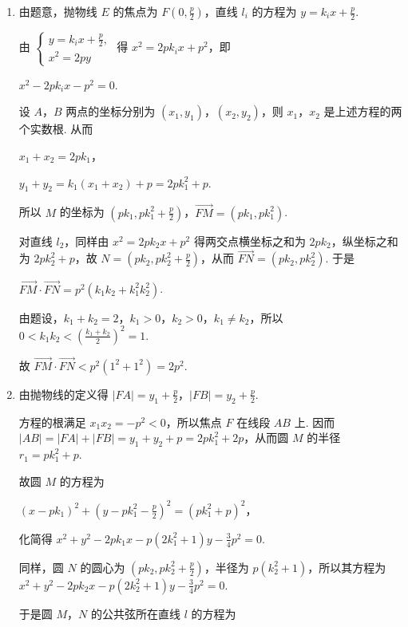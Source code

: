 \begin{solution}
\begin{enumerate}
\item 由题意，抛物线 \(E\) 的焦点为 \(F\left(0,\frac{p}{2}\right)\)，直线 \(l_i\) 的方程为 \(y=k_i x+\frac{p}{2}\).

由 \(\begin{cases}
y=k_i x+\frac{p}{2},\\
x^2=2py
\end{cases}\) 得 \(x^2=2pk_i x+p^2\)，即

\(x^2-2pk_i x-p^2=0\).

设 \(A\)，\(B\) 两点的坐标分别为 \((x_1,y_1)\)，\((x_2,y_2)\)，则 \(x_1\)，\(x_2\) 是上述方程的两个实数根. 从而

\(x_1+x_2=2pk_1\)，

\(y_1+y_2=k_1(x_1+x_2)+p=2pk_1^2+p\).

所以 \(M\) 的坐标为 \(\left(pk_1,pk_1^2+\frac{p}{2}\right)\)，\(\overrightarrow{FM}=(pk_1,pk_1^2)\).

对直线 \(l_2\)，同样由 \(x^2=2pk_2x+p^2\) 得两交点横坐标之和为 \(2pk_2\)，纵坐标之和为 \(2pk_2^2+p\)，故
\(N=\left(pk_2,pk_2^2+\frac{p}{2}\right)\)，从而 \(\overrightarrow{FN}=(pk_2,pk_2^2)\). 于是

\(\overrightarrow{FM}\cdot\overrightarrow{FN}=p^2(k_1k_2+k_1^2k_2^2)\).

由题设，\(k_1+k_2=2\)，\(k_1>0\)，\(k_2>0\)，\(k_1\ne k_2\)，所以 \(0<k_1k_2<\left(\frac{k_1+k_2}{2}\right)^2=1\).

故 \(\overrightarrow{FM}\cdot\overrightarrow{FN}<p^2(1^2+1^2)=2p^2\).

\item 由抛物线的定义得 \(\lvert FA\rvert=y_1+\frac{p}{2}\)，\(\lvert FB\rvert=y_2+\frac{p}{2}\).

方程的根满足 \(x_1x_2=-p^2<0\)，所以焦点 \(F\) 在线段 \(AB\) 上. 因而
\(\lvert AB\rvert=\lvert FA\rvert+\lvert FB\rvert=y_1+y_2+p=2pk_1^2+2p\)，从而圆 \(M\) 的半径 \(r_1=pk_1^2+p\).

故圆 \(M\) 的方程为

\(\left(x-pk_1\right)^2+\left(y-pk_1^2-\frac{p}{2}\right)^2=\left(pk_1^2+p\right)^2\)，

化简得 \(x^2+y^2-2pk_1x-p(2k_1^2+1)y-\frac{3}{4}p^2=0\).

同样，圆 \(N\) 的圆心为 \(\left(pk_2,pk_2^2+\frac{p}{2}\right)\)，半径为 \(p(k_2^2+1)\)，所以其方程为
\(x^2+y^2-2pk_2x-p(2k_2^2+1)y-\frac{3}{4}p^2=0\).

于是圆 \(M\)，\(N\) 的公共弦所在直线 \(l\) 的方程为


\end{enumerate}
\end{solution}
